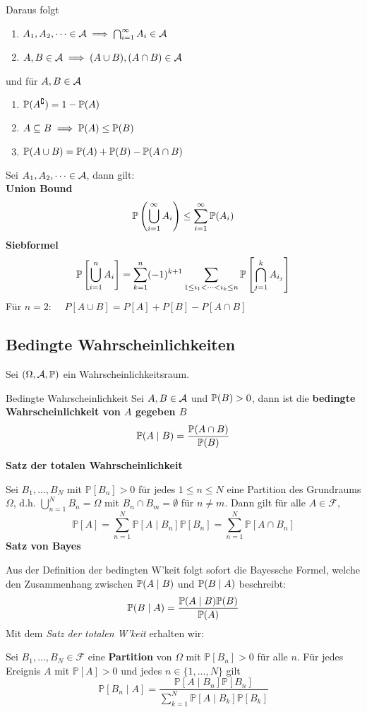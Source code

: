 Daraus folgt
\begin{enumerate}[label=\arabic*.]
    \item $A_1,A_2, \dots \in \A \implies \bigcap_{i=1}^{\infty}A_i \in \A$
    \item $A,B \in \A \implies (A \cup B), (A \cap B) \in \A$
\end{enumerate}
und für $A, B \in \A$
\begin{enumerate}[label=\arabic*.]
    \item $\P(A^\complement) = 1 - \P(A)$
    \item $A \subseteq B \implies \P(A) \leq \P(B)$
    \item $\P(A \cup B) = \P(A)+\P(B)-\P(A \cap B)$
\end{enumerate}
Sei $A_1,A_2, \dots \in \A$, dann gilt:\\
\textbf{Union Bound}
    $$\P\left(\bigcup_{i=1}^{\infty} A_i \right) \leq \sum_{i=1}^{\infty}\P(A_i)$$
\textbf{Siebformel}
    $$\P\left[\bigcup_{i=1}^n A_i\right]=\sum_{k=1}^n(-1)^{k+1} \sum_{1 \leq i_1<\cdots<i_k \leq n} \P\left[\bigcap_{j=1}^k A_{i_j}\right]$$
Für $n=2$:    $\quad P[A \cup B]=P[A]+P[B]-P[A \cap B]$
\subsection{Bedingte Wahrscheinlichkeiten}
 Sei $(\Omega, \A, \P)$ ein Wahrscheinlichkeitsraum.
 \begin{mainbox}{Bedingte Wahrscheinlichkeit}
    Sei $A, B \in \A$ und $\P(B) > 0$, dann ist die \textbf{bedingte Wahrscheinlichkeit von $A$ gegeben $B$}
    $$\P(A\mid B) = \frac{\P(A \cap B)}{\P(B)}$$
 \end{mainbox}
\textbf{Satz der totalen Wahrscheinlichkeit}

Sei $B_1, \ldots, B_N$ mit $\mathbb{P}\left[B_n\right]>0$ für jedes $1 \leq n \leq N$ eine Partition des Grundraums $\Omega$, d.h. $\bigcup_{n=1}^N B_n=\Omega$ mit $B_n \cap B_m=\emptyset$ für $n \neq m$. Dann gilt für alle $A \in \mathcal{F}$,
$$\mathbb{P}[A]=\sum_{n=1}^N \mathbb{P}\left[A \mid B_n\right] \mathbb{P}\left[B_n\right]=\sum_{n=1}^N \mathbb{P}\left[A \cap B_n\right]$$
\textbf{Satz von Bayes}

Aus der Definition der bedingten W'keit folgt sofort die Bayessche Formel, welche den Zusammenhang zwischen $\P(A\mid B)$ und $\P(B\mid A)$ beschreibt:
$$\P(B\mid A) = \frac{\P(A\mid B)\P(B)}{\P(A)}$$
Mit dem \textit{Satz der totalen W'keit} erhalten wir:

Sei $B_1, \ldots, B_N \in \mathcal{F}$ eine \textbf{Partition} von $\Omega$ mit $\mathbb{P}\left[B_n\right]>0$ für alle $n$. Für jedes Ereignis $A$ mit $\mathbb{P}[A]>0$ und jedes $n \in\{1, \ldots, N\}$ gilt
$$\mathbb{P}\left[B_n \mid A\right]=\frac{\mathbb{P}\left[A \mid B_n\right] \mathbb{P}\left[B_n\right]}{\sum_{k=1}^N \mathbb{P}\left[A \mid B_k\right] \mathbb{P}\left[B_k\right]}$$

